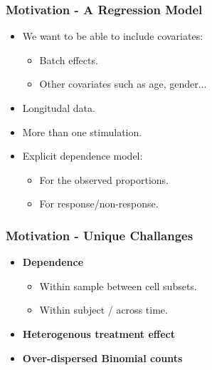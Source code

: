 \documentclass{beamer}
\theoremstyle{definition}
\begin{document}

\begin{frame}
\frametitle{Motivation - A Regression Model}
\begin{itemize}
\item We want to be able to include covariates:
	\begin{itemize}
	\item Batch effects.
	\item Other covariates such as age, gender...
	\end{itemize}

\pause
\vspace{0.7 cm}
\item Longitudal data.

\vspace{0.7 cm}
\item More than one stimulation.

\pause
\vspace{0.7 cm}
\item Explicit dependence model:
	\begin{itemize}
	\item For the observed proportions.
	\item For response/non-response.
	\end{itemize}
\end{itemize}
\end{frame}


\begin{frame}
\frametitle{Motivation - Unique Challanges}
\begin{itemize}
\item \textbf{Dependence}
	\begin{itemize}
	\item Within sample between cell subsets.
	\item Within subject / across time.  
	\end{itemize}
\vspace{0.76 cm}
\item \textbf{Heterogenous treatment effect}
\vspace{0.76 cm}
\item \textbf{Over-dispersed Binomial counts}
\end{itemize}
\end{frame}

\end{document}
